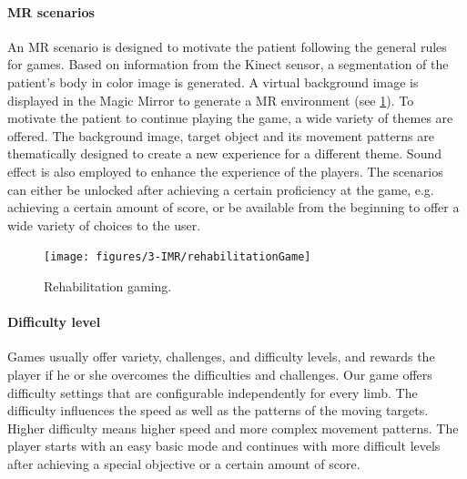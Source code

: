 \paragraph{MR scenarios}
An MR scenario is designed to motivate the patient following the general rules for games. 
Based on information from the Kinect sensor, a segmentation of the patient's body in color image is generated. A virtual background image is displayed in the Magic Mirror to generate a MR environment (see \figurename{\ref{fig:3-IMR:rehabilitationGame}}).  
To motivate the patient to continue playing the game, a wide variety of themes are offered. The background image, target object and its movement patterns are thematically designed to create a new experience for a different theme. Sound effect is also employed to enhance the experience of the players. 
The scenarios can either be unlocked after achieving a certain proficiency at the game, e.g. achieving a certain amount of score, or be available from the beginning to offer a wide variety of choices to the user. 

\begin{figure}
	\centering
	\texttt{[image: figures/3-IMR/rehabilitationGame]}
	\caption{Rehabilitation gaming. }
	\label{fig:3-IMR:rehabilitationGame}
\end{figure}
\paragraph{Difficulty level}
Games usually offer variety, challenges, and difficulty levels, and rewards the player if he or she overcomes the difficulties and challenges.
Our game offers difficulty settings that are configurable independently for every limb. The difficulty influences the speed as well as the patterns of the moving targets. Higher difficulty means higher speed and more complex movement patterns.
The player starts with an easy basic mode and continues with more difficult levels after achieving a special objective or a certain amount of score. 

